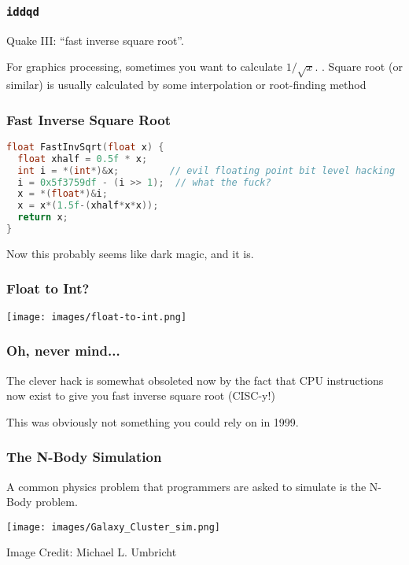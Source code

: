 \begin{frame}
\frametitle{\texttt{iddqd}}

Quake III: ``fast inverse square root''. 

For graphics processing, sometimes you want to calculate $1/\sqrt{x}$.
.
Square root (or similar) is usually calculated by some interpolation or root-finding method

\end{frame}


\begin{frame}[fragile]
\frametitle{Fast Inverse Square Root}

\begin{lstlisting}[language=C]
float FastInvSqrt(float x) {
  float xhalf = 0.5f * x;
  int i = *(int*)&x;         // evil floating point bit level hacking
  i = 0x5f3759df - (i >> 1);  // what the fuck?
  x = *(float*)&i;
  x = x*(1.5f-(xhalf*x*x));
  return x;
}
\end{lstlisting}

 Now this probably seems like dark magic, and it is. 

\end{frame}


\begin{frame}
\frametitle{Float to Int?}

\begin{center}
	\texttt{[image: images/float-to-int.png]}
\end{center}



\end{frame}



\begin{frame}
\frametitle{Oh, never mind...}


The clever hack is somewhat obsoleted now by the fact that CPU instructions now exist to give you fast inverse square root (CISC-y!)

This was obviously not something you could rely on in 1999.

\end{frame}




\begin{frame}
\frametitle{The N-Body Simulation}

A common physics problem that programmers are asked to simulate is the N-Body problem.

\begin{center}
\texttt{[image: images/Galaxy\_Cluster\_sim.png]}
\end{center}
\hfill Image Credit: Michael L. Umbricht 


\end{frame}


